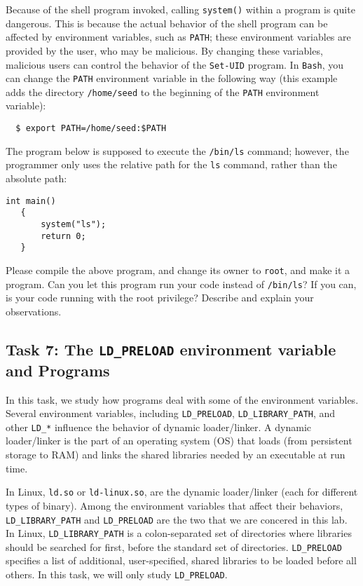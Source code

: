 Because of the shell program invoked, calling {\tt system()} 
within a \setuid program is quite dangerous. This is because the actual behavior of the 
shell program can be affected by environment variables, such
as {\tt PATH}; these environment variables are provided by the user, who 
may be malicious.  By changing these variables, malicious users can control
the behavior of the {\tt Set-UID} program. In {\tt Bash}, you can
change the {\tt PATH} environment variable in the following way (this example 
adds the directory {\tt /home/seed} to the beginning of the {\tt PATH} environment variable):
\begin{verbatim}
  $ export PATH=/home/seed:$PATH
\end{verbatim}


The \setuid program below is supposed to execute the {\tt /bin/ls} command; 
however, the programmer only uses the relative path for the {\tt ls} 
command, rather than the absolute path:

\begin{Verbatim}[frame=single] 
   int main()
   {
       system("ls");
       return 0;
   }
\end{Verbatim}

Please compile the above program, and change its owner to {\tt root}, and 
make it a \setuid program.  Can you let this \setuid program run your code instead of 
{\tt /bin/ls}?  If you can, is your code running with the root privilege?
Describe and explain your observations. 




\subsection{Task 7: The {\tt LD\_PRELOAD} environment variable and \setuid
Programs}

In this task, we study how \setuid programs deal
with some of the environment variables.
Several environment variables, including {\tt LD\_PRELOAD}, 
{\tt LD\_LIBRARY\_PATH}, and other {\tt LD\_*} influence the 
behavior of dynamic loader/linker.
A dynamic loader/linker is the part of an operating system (OS) that 
loads (from persistent storage to RAM) and links the shared libraries 
needed by an executable at run time. 

In Linux, {\tt ld.so} or {\tt ld-linux.so}, are the dynamic 
loader/linker (each for different types of binary).
Among the environment variables that affect their behaviors,
{\tt LD\_LIBRARY\_PATH} and {\tt LD\_PRELOAD} are the two
that we are concered in this lab. 
In Linux, {\tt LD\_LIBRARY\_PATH} is a colon-separated set
of directories where libraries should be searched for first, before the
standard set of directories. 
{\tt LD\_PRELOAD} specifies a list of additional, user-specified, shared libraries to
be loaded before all others. In this task, we will only 
study {\tt LD\_PRELOAD}.


